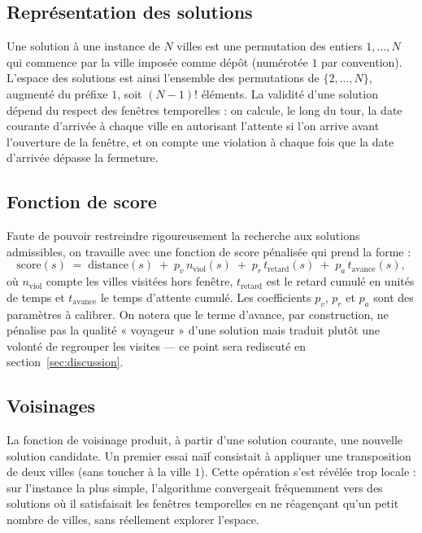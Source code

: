 \documentclass[11pt,a4paper]{article}
\begin{document}
\subsection{Représentation des solutions}

Une solution à une instance de $N$ villes est une permutation des entiers $1, \dots, N$
qui commence par la ville imposée comme dépôt (numérotée $1$ par convention). L'espace
des solutions est ainsi l'ensemble des permutations de $\{2, \dots, N\}$, augmenté du
préfixe $1$, soit $(N-1)!$ éléments. La validité d'une solution dépend du respect des
fenêtres temporelles : on calcule, le long du tour, la date courante d'arrivée à chaque
ville en autorisant l'attente si l'on arrive avant l'ouverture de la fenêtre, et on
compte une violation à chaque fois que la date d'arrivée dépasse la fermeture.

\subsection{Fonction de score}

Faute de pouvoir restreindre rigoureusement la recherche aux solutions admissibles, on
travaille avec une fonction de score pénalisée qui prend la forme :
\begin{equation}
  \mathrm{score}(s) \;=\; \mathrm{distance}(s) \;+\; p_v \, n_{\text{viol}}(s)
                \;+\; p_r \, t_{\text{retard}}(s) \;+\; p_a \, t_{\text{avance}}(s),
  \label{eq:score}
\end{equation}
où $n_{\text{viol}}$ compte les villes visitées hors fenêtre, $t_{\text{retard}}$ est
le retard cumulé en unités de temps et $t_{\text{avance}}$ le temps d'attente cumulé.
Les coefficients $p_v$, $p_r$ et $p_a$ sont des paramètres à calibrer. On notera que
le terme d'avance, par construction, ne pénalise pas la qualité « voyageur » d'une
solution mais traduit plutôt une volonté de regrouper les visites — ce point sera
rediscuté en section~\ref{sec:discussion}.

\subsection{Voisinages}

La fonction de voisinage produit, à partir d'une solution courante, une nouvelle
solution candidate. Un premier essai naïf consistait à appliquer une transposition de
deux villes (sans toucher à la ville $1$). Cette opération s'est révélée trop locale :
sur l'instance la plus simple, l'algorithme convergeait fréquemment vers des solutions
où il satisfaisait les fenêtres temporelles en ne réagençant qu'un petit nombre de
villes, sans réellement explorer l'espace.
\end{document}
